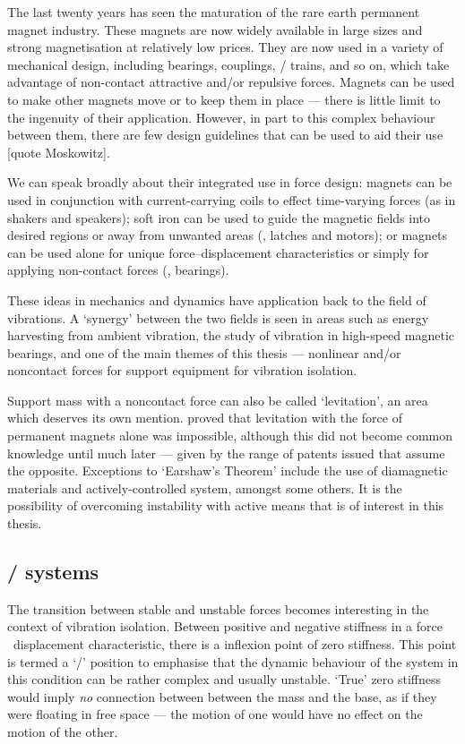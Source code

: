 The last twenty years has seen the maturation of the rare earth permanent magnet industry.
These magnets are now widely available in large sizes and strong magnetisation at relatively low prices.
They are now used in a variety of mechanical design, including bearings, couplings, \maglev/ trains, and so on, which take advantage of non-contact attractive and/or repulsive forces.
Magnets can be used to make other magnets move or to keep them in place — there is little limit to the ingenuity of their application.
However, in part to this complex behaviour between them, there are few design guidelines that can be used to aid their use [quote Moskowitz].

We can speak broadly about their integrated use in force design: magnets can be used in conjunction with current-carrying coils to effect time-varying forces (as in shakers and speakers); soft iron can be used to guide the magnetic fields into desired regions or away from unwanted areas (\eg, latches and motors); or magnets can be used alone for unique force--displacement characteristics or simply for applying non-contact forces (\eg, bearings).

These ideas in mechanics and dynamics have application back to the field of vibrations.
A `synergy' between the two fields is seen in areas such as energy harvesting from ambient vibration, the study of vibration in high-speed magnetic bearings, and one of the main themes of this thesis — nonlinear and/or noncontact forces for support equipment for vibration isolation.

Support mass with a noncontact force can also be called `levitation', an area which deserves its own mention.
\textcite{earnshaw1842} proved that levitation with the force of permanent magnets alone was impossible, although this did not become common knowledge  until much later — given by the range of patents issued that assume the opposite.
Exceptions to `Earshaw's Theorem' include the use of diamagnetic materials and actively-controlled system, amongst some others.
It is the possibility of overcoming instability with active means that is of interest in this thesis.


\subsection{\QZS/ systems}

The transition between stable and unstable forces becomes interesting in the context of vibration isolation.
Between positive and negative stiffness in a force \vs\ displacement characteristic, there is a inflexion point of zero stiffness.
This point is termed a `\qzs/' position to emphasise that the dynamic behaviour of the system in this condition can be rather complex and usually unstable.
`True' zero stiffness would imply \emph{no} connection between between the mass and the base, as if they were floating in free space — the motion of one would have no effect on the motion of the other.


